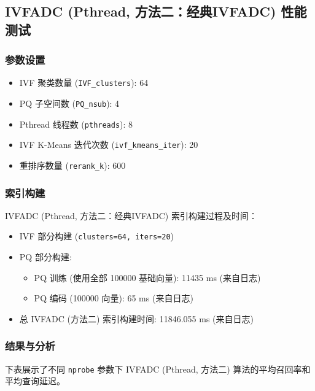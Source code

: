 \documentclass[a4paper]{article}
\begin{document}
\begin{enumerate}
\begin{itemize}
\begin{enumerate}
\begin{itemize}
\begin{itemize}
\begin{itemize}
\begin{itemize}
\begin{itemize}
\begin{enumerate}
\begin{itemize}
\begin{enumerate}
\begin{itemize}
	\subsection{IVFADC (Pthread, 方法二：经典IVFADC) 性能测试} %
	
	\subsubsection{参数设置}
	\begin{itemize}
		\item IVF 聚类数量 (\texttt{IVF\_clusters}): 64
		\item PQ 子空间数 (\texttt{PQ\_nsub}): 4
		\item Pthread 线程数 (\texttt{pthreads}): 8
		\item IVF K-Means 迭代次数 (\texttt{ivf\_kmeans\_iter}): 20
		\item 重排序数量 (\texttt{rerank\_k}): 600
	\end{itemize}
	
	\subsubsection{索引构建}
	IVFADC (Pthread, 方法二：经典IVFADC) 索引构建过程及时间：
	\begin{itemize}
		\item IVF 部分构建 (\texttt{clusters=64, iters=20})
		\item PQ 部分构建:
		\begin{itemize}
			\item PQ 训练 (使用全部 100000 基础向量): 11435 ms (来自日志)
			\item PQ 编码 (100000 向量): 65 ms (来自日志)
		\end{itemize}
		\item 总 IVFADC (方法二) 索引构建时间: 11846.055 ms (来自日志)
	\end{itemize}
	
	\subsubsection{结果与分析}
	下表展示了不同 \texttt{nprobe} 参数下 IVFADC (Pthread, 方法二) 算法的平均召回率和平均查询延迟。
	

\end{itemize}
\end{enumerate}
\end{itemize}
\end{enumerate}
\end{itemize}
\end{itemize}
\end{itemize}
\end{itemize}
\end{itemize}
\end{enumerate}
\end{itemize}
\end{enumerate}
\end{document}
